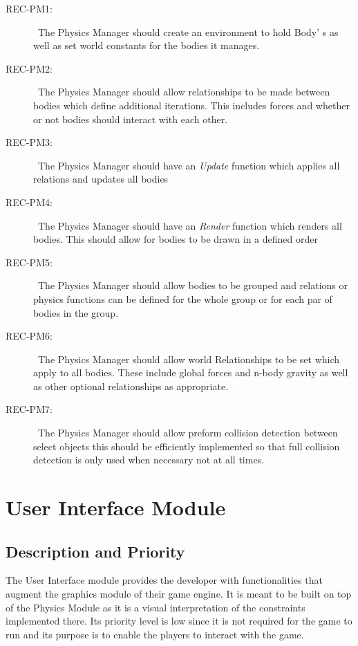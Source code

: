 \documentclass{scrreprt}
\begin{document}
\begin{description}
\item [{REC-PM1:}]~The Physics Manager should create an environment to hold Body' s as well as set world constants for the bodies it manages.
\item [{REC-PM2:}]~The Physics Manager should allow relationships to be made between bodies which define additional iterations.  This includes forces and whether or not bodies should interact with each other.
\item [{REC-PM3:}]~The Physics Manager should have an \textit{Update} function which applies all relations and updates all bodies
\item [{REC-PM4:}]~The Physics Manager should have an \textit{Render} function which renders all bodies.  This should allow for bodies to be drawn in a defined order
\item [{REC-PM5:}]~The Physics Manager should allow bodies to be grouped and relations or physics functions can be defined for the whole group or for each par of bodies in the group.
\item [{REC-PM6:}]~The Physics Manager should allow world Relationships to be set which apply to all bodies.  These include global forces and n-body gravity as well as other optional relationships as appropriate.
\item [{REC-PM7:}]~The Physics Manager should allow preform collision detection between select objects  this should be efficiently implemented so that full collision detection is only used when necessary not at all times.
\end{description}


\section{User Interface Module}
\subsection{Description and Priority}
The User Interface module provides the developer with functionalities that augment the graphics module of their game engine. It is meant to be built on top of the Physics Module as it is a visual interpretation of the constraints implemented there. Its priority level is low since it is not required for the game to run and its purpose is to enable the players to interact with the game.
\end{document}
